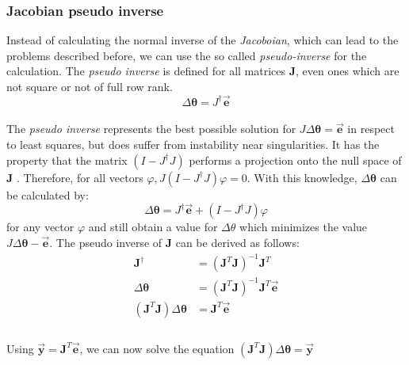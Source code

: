 \subsubsection{Jacobian pseudo inverse}
Instead of calculating the normal inverse of the \textit{Jacoboian}, which can lead to the problems described before, we can use the so called \textit{pseudo-inverse} \cite{Dahmen.2008} for the calculation. The \textit{pseudo inverse} is defined for all matrices \textbf{J}, even ones
which are not square or not of full row rank.\\
\begin{equation}
\label{pseudo inv def}
\Delta\pmb{\theta}=J^{\dagger}\vec{\pmb{e}}
\end{equation}
\\The \textit{pseudo inverse} represents the best possible solution for $ J\Delta\pmb{\theta}=\vec{\pmb{e}}$ in respect to least squares, but does suffer from instability near singularities. It has the property that the matrix $(I − J^{\dagger}J)$ performs a projection onto the null space of \textbf{J} . Therefore, for all vectors $\varphi, J(I −J^{\dagger}J)\varphi = 0$. With this knowledge, $\Delta\pmb{\theta}$ can be calculated by:
\begin{equation}
\Delta\pmb{\theta}=J^{\dagger}\vec{\pmb{e}}+(I-J^{\dagger}J)\varphi
\end{equation}
for any vector $\varphi$ and still obtain a value for $\Delta\theta$ which minimizes the value $ J\Delta\pmb{\theta} −\vec{\pmb{e}}$. The pseudo inverse of \textbf{J} can be derived as follows:\\
\begin{equation}
\begin{split}
\pmb{J}^{\dagger}&=(\pmb{J}^{T}\pmb{J})^{-1}\pmb{J}^{T}\\
\Delta\pmb{\theta}&=(\pmb{J}^{T}\pmb{J})^{-1}\pmb{J}^{T}\vec{\pmb{e}}\\
(\pmb{J}^{T}\pmb{J})\Delta\pmb{\theta}&=\pmb{J}^{T}\vec{\pmb{e}}\\
\end{split}
\end{equation}
\\Using $\vec{\pmb{y}}=\pmb{J}^{T}\vec{\pmb{e}}$, we can now solve the equation $(\pmb{J}^{T}\pmb{J})\Delta\pmb{\theta}=\vec{\pmb{y}}$

